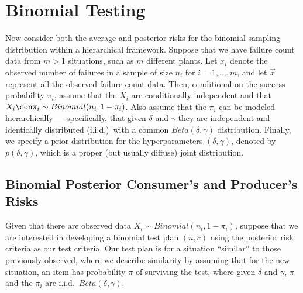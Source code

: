 \documentclass {book}
\begin{document}
\section{Binomial Testing}\label{ch10:sec2} Now consider both the
average and posterior
risks for the binomial sampling
 distribution within a
hierarchical framework. Suppose that we have failure count data
from $m > 1$ situations, such as $m$ different plants. Let $x_{i}$
denote the observed number of failures in a sample of size $n_{i}$
for $i = 1, \ldots, m$, and let $\vec{x}$ represent all the
observed failure count data. Then, conditional on the success
probability $\pi_{i}$, assume that the $X_i$ are conditionally
independent and that $X_{i} \con \pi_{i} \sim Binomial(n_{i}, 1 -
\pi_{i})$. Also assume that the $\pi_i$ can be modeled
hierarchically --- specifically, that given $\delta$ and $\gamma$
they are independent and identically distributed (i.i.d.)\ with a
common $Beta(\delta, \gamma)$ distribution. Finally, we specify a
prior distribution for the hyperparameters $(\delta, \gamma)$,
denoted by $p(\delta, \gamma)$, which is a proper (but usually
diffuse) joint distribution.


\subsection{Binomial Posterior Consumer's and Producer's
Risks}\label{ch10:sec2:ss1} Given that there are observed data
$X_i \sim Binomial(n_i, 1 - \pi_i)$, suppose that we are
interested in developing a binomial test plan $(n,c)$ using the
posterior risk criteria as our test
criteria. Our test plan is for a situation ``similar'' to those
previously observed, where we describe similarity by assuming that
for the new situation, an item has probability $\pi$ of surviving
the test, where given $\delta$ and $\gamma$, $\pi$ and the $\pi_i$
are i.i.d.\ $Beta(\delta, \gamma)$.
\end{document}
